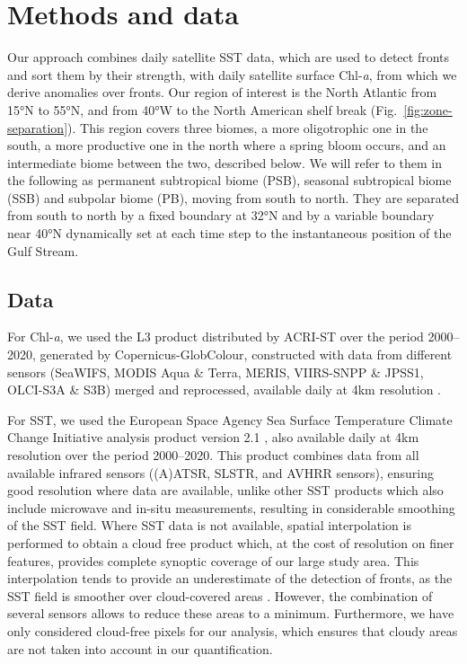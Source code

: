 \section{Methods and data}

Our approach combines daily satellite SST data, which are used to detect fronts and sort them by their strength, with daily satellite surface Chl\nobreakdash-\emph{a}, from which we derive anomalies over fronts.
Our region of interest is the North Atlantic from 15°N to 55°N, and from 40°W to the North American shelf break (Fig.~\ref{fig:zone-separation}).
This region covers three biomes, a more oligotrophic one in the south, a more productive one in the north where a spring bloom occurs, and an intermediate biome between the two, described below.
We will refer to them in the following as permanent subtropical biome (PSB), seasonal subtropical biome (SSB) and subpolar biome (PB), moving from south to north.
They are separated from south to north by a fixed boundary at 32°N and by a variable boundary near 40°N dynamically set at each time step to the instantaneous position of the Gulf Stream.

\subsection{Data}

For Chl\nobreakdash-\emph{a}, we used the L3 product distributed by ACRI-ST over the period 2000--2020, generated by Copernicus-GlobColour, constructed with data from different sensors (SeaWIFS, MODIS Aqua \& Terra, MERIS, VIIRS-SNPP \& JPSS1, OLCI-S3A \& S3B) merged and reprocessed, available daily at 4km resolution \citep{chl}.

For SST, we used the European Space Agency Sea Surface Temperature Climate Change Initiative analysis product version 2.1 \citep{merchant_2019, good_2020, sst}, also available daily at 4km resolution over the period 2000--2020.
This product combines data from all available infrared sensors ((A)ATSR, SLSTR, and AVHRR sensors), ensuring good resolution where data are available, unlike other SST products which also include microwave and in-situ measurements, resulting in considerable smoothing of the SST field. %
Where SST data is not available, spatial interpolation is performed to obtain a cloud free product which, at the cost of resolution on finer features, provides complete synoptic coverage of our large study area.
This interpolation tends to provide an underestimate of the detection of fronts, as the SST field is smoother over cloud-covered areas \citep{merchant_2019}.
However, the combination of several sensors allows to reduce these areas to a minimum.
Furthermore, we have only considered cloud-free pixels for our analysis, which ensures that cloudy areas are not taken into account in our quantification.



